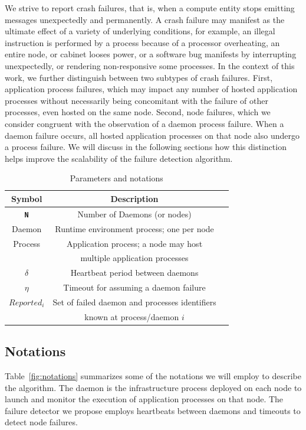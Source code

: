 \documentclass[sigconf]{acmart}
\begin{document}
We strive to report crash failures, that is, when a compute entity stops emitting
messages unexpectedly and permanently. A crash failure may manifest as
the ultimate effect of a variety of underlying conditions, for example, an illegal instruction
is performed by a process because of a processor overheating, an entire
node, or cabinet looses power, or a software bug manifests by interrupting
unexpectedly, or rendering non-responsive some processes. In the context of
this work, we further distinguish between two subtypes of crash failures.
First, application process failures, which may impact any number of
hosted application processes without necessarily being concomitant
with the failure of other processes, even hosted on the same node.
Second, node failures, which we consider congruent with the observation of a daemon
process failure. When a daemon failure occurs, all hosted application processes on
that node also undergo a process failure. We will discuss in the following
sections how this distinction helps improve the scalability of the failure
detection algorithm.

\begin{table}
  \caption{Parameters and notations}\label{fig:notations}
  \label{tab:parameters}
  \small
  \begin{tabular}{ccl}
    \toprule
    Symbol & Description \\
    \midrule
    \texttt{\bf N} & Number of Daemons (or nodes) \\
    Daemon & Runtime environment process; one per node\\
    Process & Application process; a node may host \\& multiple application processes \\
    $\delta$ & Heartbeat period between daemons\\
    $\eta$ & Timeout for assuming a daemon failure\\
    $Reported_i$ & Set of failed daemon and processes identifiers\\
                 & known at process/daemon $i$ \\
    \bottomrule
  \end{tabular}
\end{table}

\subsection{Notations}

Table~\ref{fig:notations} summarizes some of the notations we will employ
to describe the algorithm. The daemon is the infrastructure
process deployed on each node to launch and monitor the execution of application
processes on that node. The failure detector we propose employs heartbeats
between daemons and timeouts to detect node failures.
\end{document}
